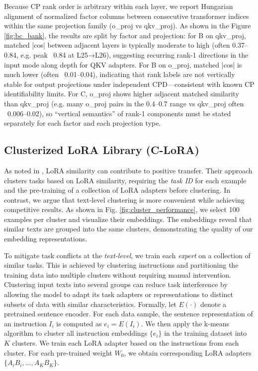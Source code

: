\documentclass[10pt]{article} %
\begin{document}
Because CP rank order is arbitrary within each layer, we report Hungarian alignment of normalized factor columns between consecutive transformer indices within the same projection family (o\_proj vs qkv\_proj). As shown in the Figure \ref{fig:bc_bank}, the results are split by factor and projection: for B on qkv\_proj, matched |cos| between adjacent layers is typically moderate to high (often 0.37–0.84, e.g. peak ~0.84 at L25→L26), suggesting recurring rank-1 directions in the input mode along depth for QKV adapters. For B on o\_proj, matched |cos| is much lower (often ~0.01–0.04), indicating that rank labels are not vertically stable for output projections under independent CPD—consistent with known CP identifiability limits. For C, o\_proj shows higher adjacent matched similarity than qkv\_proj (e.g. many o\_proj pairs in the 0.4–0.7 range vs qkv\_proj often ~0.006–0.02), so “vertical semantics” of rank-1 components must be stated separately for each factor and each projection type.
    

    \subsection{Clusterized LoRA Library (C-LoRA)}
    \label{sec:clora}

    As noted in \cite{ostapenko2024towards}, LoRA similarity can contribute to positive transfer. Their approach clusters tasks based on LoRA similarity, requiring the \textit{task ID} for each example and the pre-training of a collection of LoRA adapters before clustering. In contrast, we argue that text-level clustering is more convenient while achieving competitive results. As shown in Fig. \ref{fig:cluster_performance}, we select 100 examples per cluster and visualize their embeddings. The embeddings reveal that similar texts are grouped into the same clusters, demonstrating the quality of our embedding representations.

    To mitigate task conflicts at the \textit{text-level}, we train each \textit{expert}
    on a collection of similar tasks. This is achieved by clustering instructions
    and partitioning the training data into multiple clusters without requiring manual
    intervention. Clustering input texts into several groups can reduce task
    interference by allowing the model to adapt its task adapters or
    representations to distinct subsets of data with similar characteristics. Formally,
    let $E(\cdot)$ denote a pretrained sentence encoder. For each data sample,
    the sentence representation of an instruction $I_{i}$ is computed as
    $e_{i}=E(I_{i})$. We then apply the k-means algorithm to cluster all instruction
    embeddings $\{e_{i}\}$ in the training dataset into $K$ clusters. We train
    each LoRA adapter based on the instructions from each cluster. For each pre-trained
    weight $W_{0}$, we obtain corresponding LoRA adapters
    $\{A_{i}B_{i},...,A_{K}B_{K}\}$.
\end{document}

